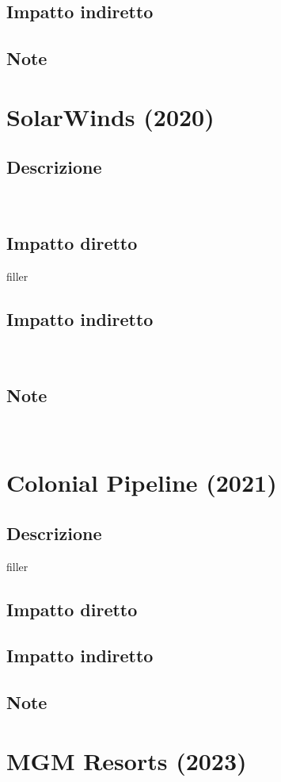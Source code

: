 \documentclass[12pt,a4paper,openright,twoside]{report}
\begin{document}
\subsection{Impatto indiretto}

\subsection{Note}
\section{SolarWinds (2020)}
\subsection{Descrizione}
\\
\subsection{Impatto diretto}
filler\\
\subsection{Impatto indiretto}
\\
\subsection{Note}
\\
\section{Colonial Pipeline (2021)}
\subsection{Descrizione}
filler\\
\subsection{Impatto diretto}

\subsection{Impatto indiretto}

\subsection{Note}
\section{MGM Resorts (2023)}
\end{document}
